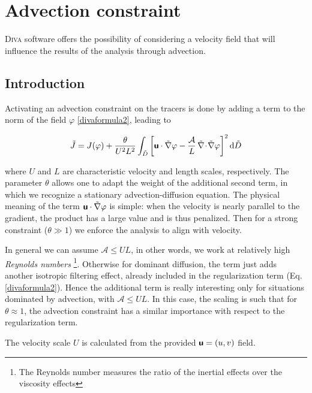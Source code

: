 \chapter{Advection constraint \label{chap:advection}}
\vspace*{-1cm}
\lettrine[lines=2, loversize=-0.1, lraise=0.1]{D}{iva} software offers the possibility of considering a velocity field that will influence the results of the analysis through advection. 

\minitoc


\section{Introduction}

Activating an advection constraint on the tracers is done by adding a term to the norm of the field $\varphi$ \eqref{divaformula2}, leading to

\begin{equation}
\tilde{J}= J(\varphi) + \frac{\theta}{U^2 L^2} \int_{\tilde{D}}\left[
\mbox{\boldmath $ \protect\mathsf{u} $} \cdot \tilde{\nabla} \varphi
- \frac{\mathcal{A}}{L} \, \tilde{\nabla}\! \cdot\! \tilde{\nabla}\varphi
\right]^2 \mbox{d} \tilde{D}
\end{equation}

where $U$ and $L$ are characteristic velocity and length scales, respectively. The parameter $\theta$ allows one to adapt the weight of the additional second term, in which we recognize a stationary advection-diffusion equation. The physical meaning of the term $\mbox{\boldmath $ \protect\mathsf{u} $} \cdot \tilde{\nabla} \varphi$ is simple: when the velocity is nearly parallel to the gradient, the product has a large value and is thus penalized. Then for a strong constraint ($\theta\gg 1$) we enforce the analysis to align with velocity.

In general we can assume $\mathcal{A} \le U L$, in other words, we work at relatively high \textit{Reynolds numbers} \footnote{The Reynolds number measures the ratio of the inertial effects over the viscosity effects}. Otherwise for dominant diffusion, the term just adds another isotropic filtering effect, already included in the regularization term (Eq. \ref{divaformula2}). Hence the additional term is really interesting only for situations dominated by advection, with $\mathcal{A} \le U L$. In this case, the scaling is such that for $\theta\approx 1$, the advection constraint has a similar importance with respect to the regularization term.

The velocity scale $U$ is calculated from the provided $\mbox{\boldmath $ \protect\mathsf{u} $}=(u,v)$ field. 

